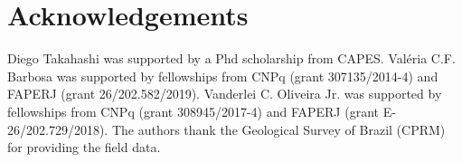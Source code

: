 \section{Acknowledgements}

Diego Takahashi was supported by a Phd scholarship from CAPES. 
Val{\'e}ria C.F. Barbosa was supported by fellowships from CNPq (grant 307135/2014-4) 
and FAPERJ (grant 26/202.582/2019). Vanderlei C. Oliveira Jr. was supported 
by fellowships from CNPq (grant 308945/2017-4) and FAPERJ (grant E-26/202.729/2018). 
The authors thank the Geological Survey of Brazil (CPRM) for providing the field data.